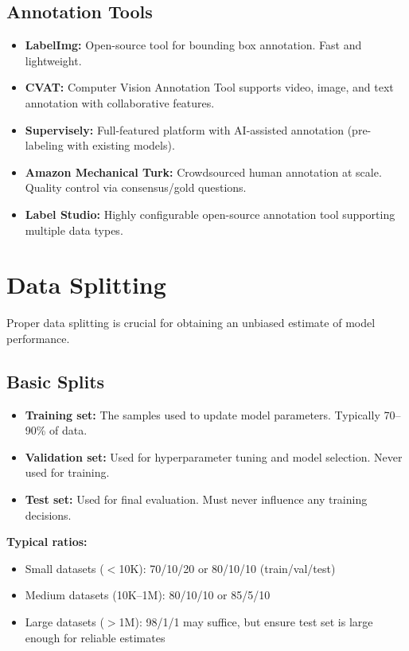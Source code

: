 \subsection{Annotation Tools}

\begin{itemize}
    \item \textbf{LabelImg:} Open-source tool for bounding box annotation. Fast and lightweight.
    \item \textbf{CVAT:} Computer Vision Annotation Tool supports video, image, and text annotation with collaborative features.
    \item \textbf{Supervisely:} Full-featured platform with AI-assisted annotation (pre-labeling with existing models).
    \item \textbf{Amazon Mechanical Turk:} Crowdsourced human annotation at scale. Quality control via consensus/gold questions.
    \item \textbf{Label Studio:} Highly configurable open-source annotation tool supporting multiple data types.
\end{itemize}

\section{Data Splitting}

Proper data splitting is crucial for obtaining an unbiased estimate of model performance.

\subsection{Basic Splits}

\begin{itemize}
    \item \textbf{Training set:} The samples used to update model parameters. Typically 70--90\% of data.
    \item \textbf{Validation set:} Used for hyperparameter tuning and model selection. Never used for training.
    \item \textbf{Test set:} Used for final evaluation. Must never influence any training decisions.
\end{itemize}

\textbf{Typical ratios:}
\begin{itemize}
    \item Small datasets ($<$10K): 70/10/20 or 80/10/10 (train/val/test)
    \item Medium datasets (10K--1M): 80/10/10 or 85/5/10
    \item Large datasets ($>$1M): 98/1/1 may suffice, but ensure test set is large enough for reliable estimates
\end{itemize}

